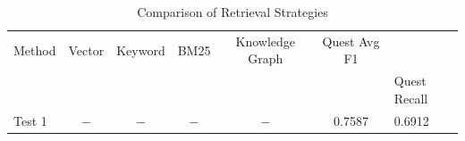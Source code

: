 
\begin{table}[h]
\centering
\caption{Comparison of Retrieval Strategies}
\label{tab:retrieval_comparison}
\begin{tabular}{lccccc}
\toprule
Method & Vector & Keyword & BM25 & Knowledge Graph & Quest Avg F1 \\ 
& & & & & & Quest Recall \\
\midrule
Test 1 & $-$ & $-$ & $-$ & $-$ & 0.7587 & 0.6912 \\
\bottomrule
\end{tabular}
\end{table}
